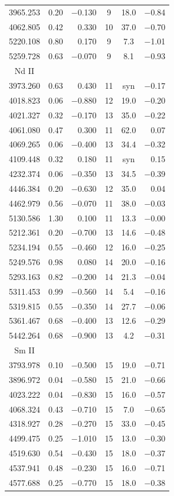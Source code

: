 \documentclass{aa}
\begin{document}
\begin{table}
\begin{tabular}{ccrccr}
3965.253 & 0.20 & $-$0.130 & 9  &  18.0 & $-$0.84\\
4062.805 & 0.42 &    0.330 & 10 &  37.0 & $-$0.70\\
5220.108 & 0.80 &    0.170 & 9  &   7.3 & $-$1.01\\
5259.728 & 0.63 & $-$0.070 & 9  &   8.1 & $-$0.93\\
\hline
Nd II\\
\hline
3973.260 & 0.63 &    0.430 & 11 &  syn  & $-$0.17\\
4018.823 & 0.06 & $-$0.880 & 12 &  19.0 & $-$0.20\\
4021.327 & 0.32 & $-$0.170 & 13 &  35.0 & $-$0.22\\
4061.080 & 0.47 &    0.300 & 11 &  62.0 &    0.07\\
4069.265 & 0.06 & $-$0.400 & 13 &  34.4 & $-$0.32\\
4109.448 & 0.32 &    0.180 & 11 &  syn  &   0.15\\
4232.374 & 0.06 & $-$0.350 & 13 &  34.5 & $-$0.39\\
4446.384 & 0.20 & $-$0.630 & 12 &  35.0 &    0.04\\
4462.979 & 0.56 & $-$0.070 & 11 &  38.0 & $-$0.03\\
5130.586 & 1.30 &    0.100 & 11 &  13.3 & $-$0.00\\
5212.361 & 0.20 & $-$0.700 & 13 &  14.6 & $-$0.48\\
5234.194 & 0.55 & $-$0.460 & 12 &  16.0 & $-$0.25\\
5249.576 & 0.98 &    0.080 & 14 &  20.0 & $-$0.16\\
5293.163 & 0.82 & $-$0.200 & 14 &  21.3 & $-$0.04\\
5311.453 & 0.99 & $-$0.560 & 14 &   5.4 & $-$0.16\\
5319.815 & 0.55 & $-$0.350 & 14 &  27.7 & $-$0.06\\
5361.467 & 0.68 & $-$0.400 & 13 &  12.6 & $-$0.29\\
5442.264 & 0.68 & $-$0.900 & 13 &   4.2 & $-$0.31\\
\hline
Sm II\\
\hline
3793.978 & 0.10 & $-$0.500 & 15 &  19.0 & $-$0.71\\
3896.972 & 0.04 & $-$0.580 & 15 &  21.0 & $-$0.66\\
4023.222 & 0.04 & $-$0.830 & 15 &  16.0 & $-$0.57\\
4068.324 & 0.43 & $-$0.710 & 15 &   7.0 & $-$0.65\\
4318.927 & 0.28 & $-$0.270 & 15 &  33.0 & $-$0.45\\
4499.475 & 0.25 & $-$1.010 & 15 &  13.0 & $-$0.30\\
4519.630 & 0.54 & $-$0.430 & 15 &  18.0 & $-$0.37\\
4537.941 & 0.48 & $-$0.230 & 15 &  16.0 & $-$0.71\\
4577.688 & 0.25 & $-$0.770 & 15 &  18.0 & $-$0.38\\
\end{tabular}
\end{table}
\end{document}
